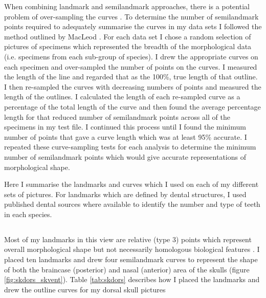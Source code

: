 	When combining landmark and semilandmark approaches, there is a potential problem of over-sampling the curves \citep{MacLeod2012}. To determine the number of semilandmark points required to adequately summarise the curves in my data sets I followed the method outlined by MacLeod \citeyearpar{MacLeod2012}. For each data set I chose a random selection of pictures of specimens which represented the breadth of the morphological data (i.e. specimens from each sub-group of species). I drew the appropriate curves on each specimen and over-sampled the number of points on the curves. I measured the length of the line and regarded that as the 100\%, true length of that outline. I then re-sampled the curves with decreasing numbers of points and measured the length of the outlines. I calculated the length of each re-sampled curve as a percentage of the total length of the curve and then found the average percentage length for that reduced number of semilandmark points across all of the specimens in my test file. I continued this process until I found the minimum number of points that gave a curve length which was at least 95\% accurate.  I repeated these curve-sampling tests for each analysis to determine the minimum number of semilandmark points which would give accurate representations of morphological shape.
	
	Here I summarise the landmarks and curves which I used on each of my different sets of pictures. For landmarks which are defined by dental structures, I used published dental sources \citep{Repenning1967, Eisenberg1969, Nowak1983, MacPhee1987, KnoxJones1992, Davis1997, Querouil2001, Nagorsen2002, Wilson2005, Goodman2006, Karatas2007, Hoffmann2008, Asher2008, Lin2010,  Muldoon2009} where available to identify the number and type of teeth in each species.
	
\subsection{}
	Most of my landmarks in this view are relative (type 3) points which represent overall morphological shape but not necessarily homologous biological features \citep{Zelditch2012}. I placed ten landmarks and drew four semilandmark curves to represent the shape of both the braincase (posterior) and nasal (anterior) area of the skulls (figure \ref{fig:skdors_skvent}). Table \ref{tab:skdors} describes how I placed the landmarks and drew the outline curves for my dorsal skull pictures 

